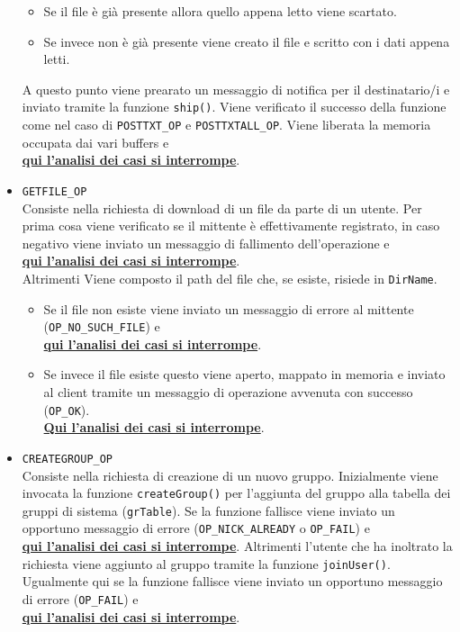 \documentclass[a4paper,12pt]{report}
\begin{document}
\begin{itemize}
  \begin{itemize}
  \item Se il file è già presente allora quello appena letto viene scartato.
  \item Se invece non è già presente viene creato il file e scritto con i dati appena letti.
  \end{itemize}
  A questo punto viene prearato un messaggio di notifica per il destinatario/i e inviato tramite la funzione \texttt{ship()}. Viene verificato il successo della funzione come nel caso di \texttt{POSTTXT\_OP} e \texttt{POSTTXTALL\_OP}. Viene liberata la memoria occupata dai vari buffers e\\ \textbf{\underline{qui l'analisi dei casi si interrompe}}.
\item \texttt{GETFILE\_OP}\\
  Consiste nella richiesta di download di un file da parte di un utente. Per prima cosa viene verificato se il mittente è effettivamente registrato, in caso negativo viene inviato un messaggio di fallimento dell'operazione e\\ \textbf{\underline{qui l'analisi dei casi si interrompe}}.\\ Altrimenti Viene composto il path del file che, se esiste, risiede in \texttt{DirName}.
  \begin{itemize}
    \item Se il file non esiste viene inviato un messaggio di errore al mittente (\texttt{OP\_NO\_SUCH\_FILE}) e\\ \textbf{\underline{qui l'analisi dei casi si interrompe}}.
    \item Se invece il file esiste questo viene aperto, mappato in memoria e inviato al client tramite un messaggio di operazione avvenuta con successo (\texttt{OP\_OK}).\\ \textbf{\underline{Qui l'analisi dei casi si interrompe}}.
  \end{itemize}
\item \texttt{CREATEGROUP\_OP}\\
  Consiste nella richiesta di creazione di un nuovo gruppo. Inizialmente viene invocata la funzione \texttt{createGroup()} per l'aggiunta del gruppo alla tabella dei gruppi di sistema (\texttt{grTable}). Se la funzione fallisce viene inviato un opportuno messaggio di errore (\texttt{OP\_NICK\_ALREADY} o \texttt{OP\_FAIL}) e\\ \textbf{\underline{qui l'analisi dei casi si interrompe}}. Altrimenti l'utente che ha inoltrato la richiesta viene aggiunto al gruppo tramite la funzione \texttt{joinUser()}. Ugualmente qui se la funzione fallisce viene inviato un opportuno messaggio di errore (\texttt{OP\_FAIL}) e\\ \textbf{\underline{qui l'analisi dei casi si interrompe}}.

\end{itemize}
\end{document}

